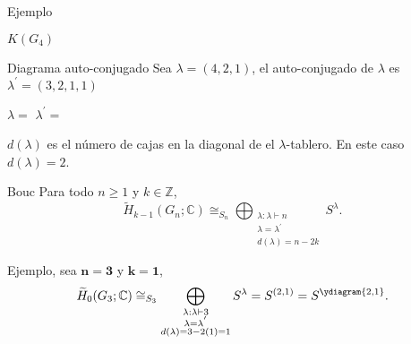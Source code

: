 \documentclass[final,xcolor=svgnames]{beamer}
\begin{document}
\begin{frame}{}
\begin{columns}
\begin{column}{0.5\textwidth}
\begin{block}{Ejemplo}
\begin{minipage}{0.3\linewidth}
            $K(G_{4})$
                  \end{minipage}
      \end{block}

      \begin{block}{Diagrama auto-conjugado}
        Sea $\lambda=(4,2,1)$, el \alert{auto-conjugado de $\lambda$} 
        es $\lambda^{'}=(3,2,1,1)$
        \begin{center}
          $\lambda=$ \quad
          $\lambda^{'}=$
        \end{center}
        $d(\lambda)$ es el número de cajas en la diagonal de el
        $\lambda$-tablero. En este caso $d(\lambda)=2$.
      \end{block}

      \begin{block}{Bouc}
          Para todo $n\geq1$ y $k\in \mathbb{Z}$,
          \begin{equation*}
            \widetilde H_{k-1}(G_{n};\mathbb{C})\cong_{S_{n}}\bigoplus_{\substack{\lambda:\lambda\vdash n\\
              \lambda=\lambda^{'}\\d(\lambda)=n-2k}} S^{\lambda}.
          \end{equation*}
       \end{block}
       
        \begin{block}{Ejemplo, sea $\boldsymbol{n=3}$ y $\boldsymbol{k=1}$,}
          \begin{equation*}
            \widetilde H_{0}(G_{3};\mathbb{C})\cong_{S_{3}}\bigoplus_{\substack{\lambda:\lambda\vdash 3\\
              \lambda=\lambda^{'}\\d(\lambda)=3-2(1)=1}} S^{\lambda}=S^{(2,1)}=S^{\ydiagram{2,1}}.
          \end{equation*}
       \end{block}


\end{column}
\end{columns}
\end{frame}
\end{document}
